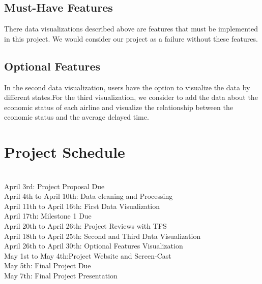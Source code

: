 \documentclass[11pt]{article}
\theoremstyle{definition}
\begin{document}
\subsection{\textbf{Must-Have Features}}
There data visualizations described above are features that must be implemented in this project. We would consider our project as a failure without these features. 
\subsection{\textbf{Optional Features}}
In the second data visualization, users have the option to visualize the data by different states.For the third visualization, we consider to add the data about the economic status of each airline and visualize the relationship between the economic status and the average delayed time.

\section{\textbf{Project Schedule}}
\\April 3rd: Project Proposal Due
\\April 4th to April 10th: Data cleaning and Processing
\\April 11th to April 16th: First Data Visualization
\\April 17th: Milestone 1 Due
\\April 20th to April 26th: Project Reviews with TFS
\\April 18th to April 25th: Second and Third Data Visualization
\\April 26th to April 30th: Optional Features Visualization
\\May 1st to May 4th:Project Website and Screen-Cast
\\May 5th: Final Project Due
\\May 7th: Final Project Presentation
\end{document}
